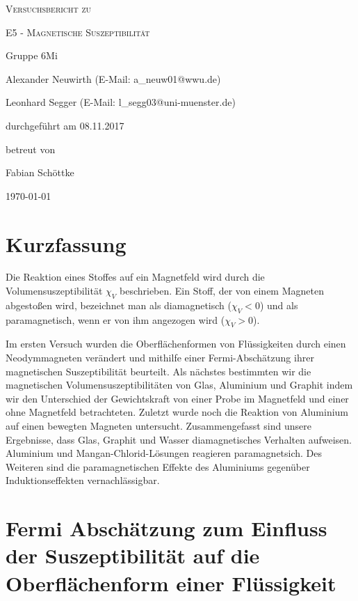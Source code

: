 \documentclass[
	a4paper,
	12pt,
	pagesize,
	ngerman
]{scrartcl}
\begin{document}
	
	\begin{titlepage}
		\centering
		{\scshape\LARGE Versuchsbericht zu \par}
		\vspace{1cm}
		{\scshape\huge E5 - Magnetische Suszeptibilität\par}
		\vspace{2.5cm}
		{\LARGE Gruppe 6Mi \par}
		\vspace{0.5cm}
		
		{\large Alexander Neuwirth (E-Mail: a\_neuw01@wwu.de) \par}
		{\large Leonhard Segger (E-Mail: l\_segg03@uni-muenster.de) \par}
		\vfill
		
		durchgeführt am 08.11.2017\par
		betreut von\par
		{\large Fabian Schöttke}
		
		\vfill
		
		{\large \today\par}
	\end{titlepage}
	\tableofcontents
	\newpage
	
	\section{Kurzfassung}
	Die Reaktion eines Stoffes auf ein Magnetfeld wird durch die Volumensuszeptibilität $\chi_V$ beschrieben. Ein Stoff, der von einem Magneten abgestoßen wird, bezeichnet man als diamagnetisch ($\chi_V<0$) und als paramagnetisch, wenn er von ihm angezogen wird ($\chi_V>0$).

	Im ersten Versuch wurden die Oberflächenformen von Flüssigkeiten durch einen Neodymmagneten verändert und mithilfe einer Fermi-Abschätzung ihrer magnetischen Suszeptibilität beurteilt.
	Als nächstes bestimmten wir die magnetischen Volumensuszeptibilitäten von Glas, Aluminium und Graphit indem wir den Unterschied der Gewichtskraft von einer Probe im Magnetfeld und einer ohne Magnetfeld betrachteten. 
	Zuletzt wurde noch die Reaktion von Aluminium auf einen bewegten Magneten untersucht.
	Zusammengefasst sind unsere Ergebnisse, dass Glas, Graphit und Wasser diamagnetisches Verhalten aufweisen. Aluminium und Mangan-Chlorid-Lösungen reagieren paramagnetsich. Des Weiteren sind die paramagnetischen Effekte des Aluminiums gegenüber Induktionseffekten vernachlässigbar. 
	
	\section{Fermi Abschätzung zum Einfluss der Suszeptibilität auf die Oberflächenform einer Flüssigkeit}
\end{document}
